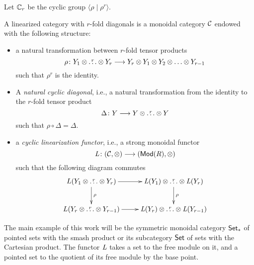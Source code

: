 Let $\mathbb{C}_r$ be the cyclic group $\langle\rho\mid \rho^r\rangle$.
\begin{definition} A linearized category with $r$-fold diagonals is a monoidal category $\mathcal{C}$ %
endowed with the following structure:
\begin{itemize}
	\item a natural transformation between $r$-fold tensor products
	\[
	\rho \colon Y_1 \ot \overset{r}{\dots} \ot Y_r \lra Y_r \ot Y_1 \ot Y_2 \ot \dots \ot Y_{r-1}
	\]
	such that $\rho^r$ is the identity.
	\item A \emph{natural cyclic diagonal}, i.e., a natural transformation from the identity to the $r$-fold tensor product
	\[
	\Delta \colon Y \longrightarrow Y \otimes \overset{r}{\dots} \otimes Y
	\]
	such that $\rho\circ \Delta = \Delta$.
	\item a \emph{cyclic linearization functor}, i.e., a %
 strong monoidal functor
	\[
	\operatorname{{\it L}} \colon (\mathcal{C}, \otimes ) \longrightarrow (\mathsf{Mod}(R), \otimes )
	\]
	such that the following diagram commutes
	\[
	\xymatrix{
		L(Y_1 \ot \overset{r}{\dots} \ot Y_r) \ar[r]\ar[d]^{\rho} & \abel(Y_1) \ot \overset{r}{\dots} \ot \abel(Y_r)\ar[d]^{\rho} \\
		L(Y_{r} \ot \overset{r}{\dots} \ot Y_{r-1}) \ar[r] & \abel(Y_r) \ot \overset{r}{\dots} \ot \abel(Y_{r-1}) }
	\]
\end{itemize}
\end{definition}
The main example of this work will be the symmetric monoidal category $\mathsf{Set}_*$ of pointed sets with the smash product or its subcategory $\mathsf{Set}$ of sets with the Cartesian product. The functor $\operatorname{{\it L}}$ takes a set to the free module on it, and a pointed set to the quotient of its free module by the base point.



